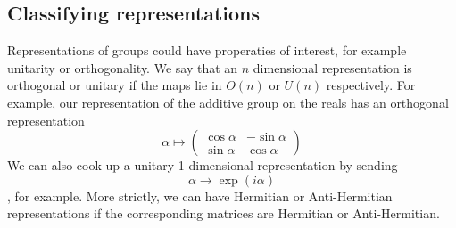 \subsection{Classifying representations}
Representations of groups could have properaties of interest, for example unitarity or orthogonality. We say that an $n$ dimensional representation is orthogonal or unitary if the maps lie in $O(n)$ or $U(n) $ respectively. For example, our representation of the additive group on the reals has an orthogonal representation \[ \alpha \mapsto \begin{pmatrix} \cos \alpha & -\sin \alpha \\ \sin \alpha & \cos \alpha \end{pmatrix} \] 
We can also cook up a unitary 1 dimensional representation by sending \[ \alpha \rightarrow \exp ( i \alpha )\], for example. More strictly, we can have Hermitian or Anti-Hermitian representations if the corresponding matrices are Hermitian or Anti-Hermitian. 

